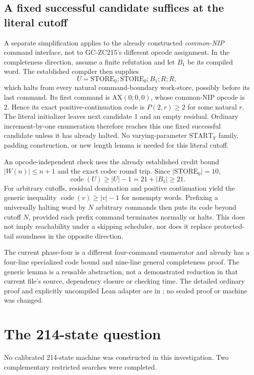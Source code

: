 \documentclass[11pt]{article}
\newcommand{\file}[1]{{\small\path{#1}}}
\begin{document}
\subsection{A fixed successful candidate suffices at the literal cutoff}
A separate simplification applies to the already constructed \emph{common-NIP} command interface, not to GC-ZC215's different opcode assignment. In the completeness direction, assume a finite refutation and let $B_1$ be its compiled word. The established compiler then supplies
\[
 U=\mathrm{STORE}_0;\mathrm{STORE}_0;B_1;R;R,
\]
which halts from every natural command-boundary work-store, possibly before its last command. Its first command is $\mathrm{AX}(0;0,0)$, whose common-NIP opcode is 2. Hence its exact positive-continuation code is $P(2,r)\ge2$ for some natural $r$. The literal initializer leaves next candidate 1 and an empty residual. Ordinary increment-by-one enumeration therefore reaches this one fixed successful candidate unless it has already halted. No varying-parameter $\mathrm{START}_Y$ family, padding construction, or new length lemma is needed for this literal cutoff.

An opcode-independent check uses the already established credit bound $|W(n)|\le n+1$ and the exact codec round trip. Since $|\mathrm{STORE}_0|=10$,
\[
 \operatorname{code}(U)\ge |U|-1=21+|B_1|\ge21.
\]
For arbitrary cutoffs, residual domination and positive continuation yield the generic inequality $\operatorname{code}(v)\ge |v|-1$ for nonempty words. Prefixing a universally halting word by $N$ arbitrary commands then puts its code beyond cutoff $N$, provided each prefix command terminates normally or halts. This does not imply reachability under a skipping scheduler, nor does it replace protected-tail soundness in the opposite direction.

The current phase-four \file{EnumPerm} is a different four-command enumerator and already has a four-line specialized code bound and nine-line general completeness proof. The generic lemma is a reusable abstraction, not a demonstrated reduction in that current file's source, dependency closure or checking time. The detailed ordinary proof and explicitly uncompiled Lean adapter are in \file{enumeration/}; no sealed proof or machine was changed.

\section{The 214-state question}
No calibrated 214-state machine was constructed in this investigation. Two complementary restricted searches were completed.
\end{document}

